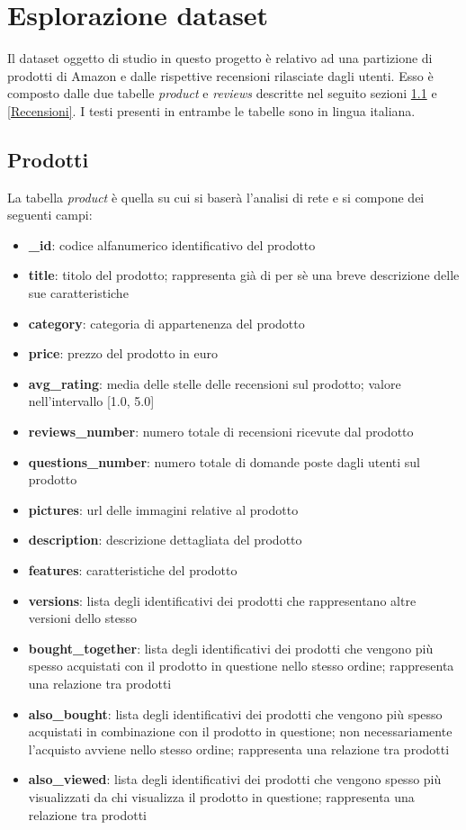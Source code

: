 \section{Esplorazione dataset}\label{EsplorazioneDataset}
Il dataset oggetto di studio in questo progetto è relativo ad una partizione di prodotti di Amazon e dalle rispettive recensioni rilasciate dagli utenti. Esso è composto dalle due tabelle \textit{product} e \textit{reviews} descritte nel seguito sezioni \ref{Prodotti} e \ref{Recensioni}. I testi presenti in entrambe le tabelle sono in lingua italiana.

\subsection{Prodotti}\label{Prodotti}
La tabella \textit{product} è quella su cui si baserà l'analisi di rete e si compone dei seguenti campi:
\begin{itemize}
    \item \textbf{\_id}: codice alfanumerico identificativo del prodotto
    \item \textbf{title}: titolo del prodotto; rappresenta già di per sè una breve descrizione delle sue caratteristiche
    \item \textbf{category}: categoria di appartenenza del prodotto
    \item \textbf{price}: prezzo del prodotto in euro
    \item \textbf{avg\_rating}: media delle stelle delle recensioni sul prodotto; valore nell'intervallo [1.0, 5.0] 
    \item \textbf{reviews\_number}: numero totale di recensioni ricevute dal prodotto
    \item \textbf{questions\_number}: numero totale di domande poste dagli utenti sul prodotto
    \item \textbf{pictures}: url delle immagini relative al prodotto
    \item \textbf{description}: descrizione dettagliata del prodotto
    \item \textbf{features}: caratteristiche del prodotto
    \item \textbf{versions}: lista degli identificativi dei prodotti che rappresentano altre versioni dello stesso
    \item \textbf{bought\_together}: lista degli identificativi dei prodotti che vengono più spesso acquistati con il prodotto in questione nello stesso ordine; rappresenta una relazione tra prodotti
    \item \textbf{also\_bought}: lista degli identificativi dei prodotti che vengono più spesso acquistati in combinazione con il prodotto in questione; non necessariamente l'acquisto avviene nello stesso ordine; rappresenta una relazione tra prodotti
    \item \textbf{also\_viewed}: lista degli identificativi dei prodotti che vengono spesso più visualizzati da chi visualizza il prodotto in questione; rappresenta una relazione tra prodotti
\end{itemize}
